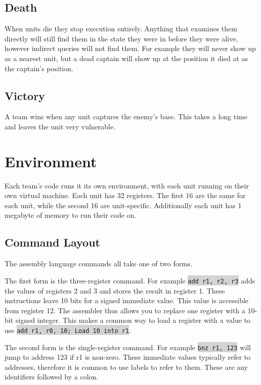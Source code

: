 \documentclass{article}
\newcommand{\vnscode}[1]{\colorbox{lightgray}{\lstinline[language=vns]{#1}}}
\begin{document}
\subsection{Death}

When units die they stop execution entirely. Anything that examines them
directly will still find them in the state they were in before they were alive,
however indirect queries will not find them. For example they will never show up
as a nearest unit, but a dead captain will show up at the position it died at as
the captain's position.

\subsection{Victory}

A team wins when any unit captures the enemy's base. This takes a long time and
leaves the unit very vulnerable.

\section{Environment}

Each team's code runs it its own environment, with each unit running on their
own virtual machine. Each unit has 32 registers. The first 16 are the same for
each unit, while the second 16 are unit-specific. Additionally each unit has 1
megabyte of memory to run their code on.

\subsection{Command Layout}

The assembly language commands all take one of two forms.

The first form is the three-register command. For example \vnscode{add r1, r2,
r3} adds the values of registers 2 and 3 and stores the result in register 1.
These instructions leave 10 bits for a signed immediate value. This value is
accessible from register 12.  The assembler thus allows you to replace one
register with a 10-bit signed integer. This makes a common way to load a
register with a value to use \vnscode{add r1, r0, 10; Load 10 into r1}.

The second form is the single-register command. For example \vnscode{bnz r1,
123} will jump to address 123 if r1 is non-zero. These immediate values
typically refer to addresses, therefore it is common to use labels to refer to
them. These are any identifiers followed by a colon.
\end{document}

